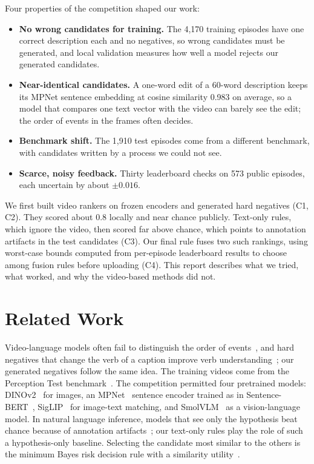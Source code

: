\documentclass[10pt,twocolumn]{article}
\newcommand{\cha}[1]{\textsf{C#1}}
\begin{document}
Four properties of the competition shaped our work:
\begin{itemize}
\item[\cha1] \textbf{No wrong candidates for training.} The 4,170 training episodes have one correct description
  each and no negatives, so wrong candidates must be generated, and local validation measures how well a model
  rejects our generated candidates.
\item[\cha2] \textbf{Near-identical candidates.} A one-word edit of a 60-word description keeps its MPNet sentence
  embedding at cosine similarity 0.983 on average, so a model that compares one text vector with the video can
  barely see the edit; the order of events in the frames often decides.
\item[\cha3] \textbf{Benchmark shift.} The 1,910 test episodes come from a different benchmark, with candidates
  written by a process we could not see.
\item[\cha4] \textbf{Scarce, noisy feedback.} Thirty leaderboard checks on 573 public episodes, each uncertain by
  about $\pm0.016$.
\end{itemize}

We first built video rankers on frozen encoders and generated hard negatives (\cha1, \cha2). They scored about
0.8 locally and near chance publicly. Text-only rules, which ignore the video, then scored far above chance, which
points to annotation artifacts in the test candidates (\cha3). Our final rule fuses two such rankings, using
worst-case bounds computed from per-episode leaderboard results to choose among fusion rules before uploading
(\cha4). This report describes what we tried, what worked, and why the video-based methods did not.

\section{Related Work}

Video-language models often fail to distinguish the order of events~\cite{bagad2023testoftime}, and hard negatives
that change the verb of a caption improve verb understanding~\cite{momeni2023verbs}; our generated negatives follow
the same idea. The training videos come from the Perception Test benchmark~\cite{patraucean2023perception}. The
competition permitted four pretrained models: DINOv2~\cite{oquab2023dinov2} for images, an MPNet~\cite{song2020mpnet}
sentence encoder trained as in Sentence-BERT~\cite{reimers2019sbert}, SigLIP~\cite{zhai2023siglip} for image-text
matching, and SmolVLM~\cite{marafioti2025smolvlm} as a vision-language model. In natural language inference,
models that see only the hypothesis beat chance because of annotation artifacts~\cite{gururangan2018artifacts,poliak2018hypothesis};
our text-only rules play the role of such a hypothesis-only baseline. Selecting the candidate most similar to the
others is the minimum Bayes risk decision rule with a similarity utility~\cite{kumar2004mbr}.
\end{document}
